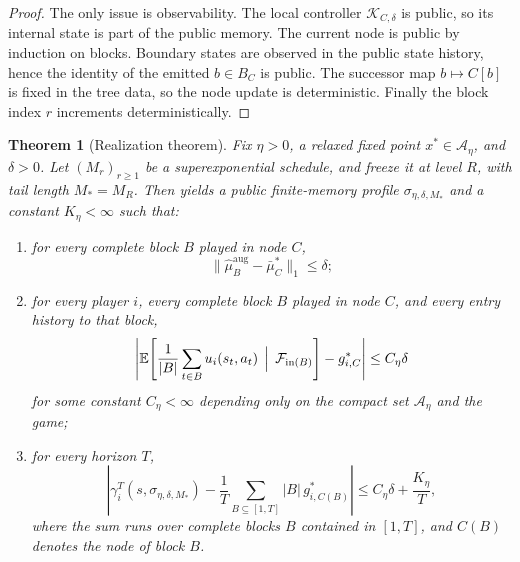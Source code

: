 \documentclass[12pt]{article}
\newtheorem{theorem}{Theorem}[section]
\theoremstyle{definition}
\newcommand{\E}{\mathbb{E}}
\newcommand{\1}{\mathbf{1}}
\newcommand{\cA}{\mathcal{A}}
\newcommand{\cK}{\mathcal{K}}
\begin{document}
\begin{proof}
The only issue is observability.  The local controller \(\cK_{C,\delta}\) is public, so its
internal state is part of the public memory.  The current node is public by induction on
blocks.  Boundary states are observed in the public state history, hence the identity of
the emitted \(b\in B_C\) is public.  The successor map \(b\mapsto C[b]\) is fixed in the
tree data, so the node update is deterministic.  Finally the block index \(r\) increments
deterministically.
\end{proof}

\begin{theorem}[Realization theorem]
\label{thm:realization}
Fix \(\eta>0\), a relaxed fixed point \(x^*\in \cA_\eta\), and \(\delta>0\).  Let
\((M_r)_{r\ge 1}\) be a superexponential schedule, and freeze it at level \(R\), with tail
length \(M_*=M_R\).  Then  yields a public finite-memory profile
\(\sigma_{\eta,\delta,M_*}\) and a constant \(K_\eta<\infty\) such that:
\begin{enumerate}[label=\textnormal{(R\arabic*)},leftmargin=2.8em]
\item for every complete block \(B\) played in node \(C\),
\begin{equation}
\label{eq:block-aug}
\bigl\|\widehat\mu_B^{\mathrm{aug}}-\bar\mu_C^*\bigr\|_1\le \delta;
\end{equation}
\item for every player \(i\), every complete block \(B\) played in node \(C\), and every
entry history to that block,
\begin{equation}
\label{eq:block-payoff-close}
\left|
\E\!\left[\frac1{|B|}\sum_{t\in B}u_i(s_t,a_t)\,\Bigm|\,\mathcal F_{\mathrm{in}(B)}\right]
-g_{i,C}^*
\right|
\le C_\eta \delta
\end{equation}
for some constant \(C_\eta<\infty\) depending only on the compact set \(\cA_\eta\) and the
game;
\item for every horizon \(T\),
\begin{equation}
\label{eq:realization-tail}
\left|
\gamma_i^T(s,\sigma_{\eta,\delta,M_*})
-
\frac1T\sum_{B\subseteq [1,T]} |B|\,g_{i,C(B)}^*
\right|
\le C_\eta\delta+\frac{K_\eta}{T},
\end{equation}
where the sum runs over complete blocks \(B\) contained in \([1,T]\), and \(C(B)\) denotes
the node of block \(B\).
\end{enumerate}
\end{theorem}
\end{document}
